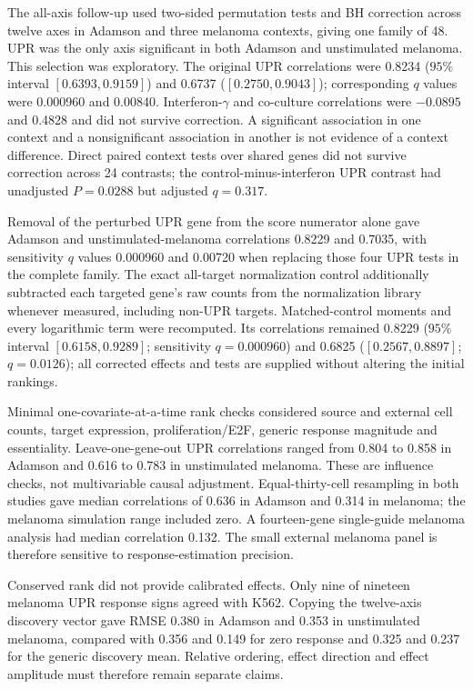 \documentclass[a4paper,fleqn]{cas-sc}
\makeatletter
\DeclareRobustCommand{\rev}[1]{{\color{red}\def\@citecolor{black}\def\@linkcolor{red}\def\@urlcolor{red}#1}}
\makeatother
\begin{document}
\rev{The all-axis follow-up used two-sided permutation tests and BH correction across twelve axes in Adamson and three melanoma contexts, giving one family of 48.} \rev{UPR was the only axis significant in both Adamson and unstimulated melanoma.} \rev{This selection was exploratory.} \rev{The original UPR correlations were 0.8234 ($95\%$ interval $[0.6393,0.9159]$) and 0.6737 ($[0.2750,0.9043]$); corresponding $q$ values were 0.000960 and 0.00840.} \rev{Interferon-$\gamma$ and co-culture correlations were $-0.0895$ and 0.4828 and did not survive correction.} \rev{A significant association in one context and a nonsignificant association in another is not evidence of a context difference.} \rev{Direct paired context tests over shared genes did not survive correction across 24 contrasts; the control-minus-interferon UPR contrast had unadjusted $P=0.0288$ but adjusted $q=0.317$.}

\rev{Removal of the perturbed UPR gene from the score numerator alone gave Adamson and unstimulated-melanoma correlations 0.8229 and 0.7035, with sensitivity $q$ values 0.000960 and 0.00720 when replacing those four UPR tests in the complete family.} \rev{The exact all-target normalization control additionally subtracted each targeted gene's raw counts from the normalization library whenever measured, including non-UPR targets.} \rev{Matched-control moments and every logarithmic term were recomputed.} \rev{Its correlations remained 0.8229 ($95\%$ interval $[0.6158,0.9289]$; sensitivity $q=0.000960$) and 0.6825 ($[0.2567,0.8897]$; $q=0.0126$); all corrected effects and tests are supplied without altering the initial rankings.}

\rev{Minimal one-covariate-at-a-time rank checks considered source and external cell counts, target expression, proliferation/E2F, generic response magnitude and essentiality.} \rev{Leave-one-gene-out UPR correlations ranged from 0.804 to 0.858 in Adamson and 0.616 to 0.783 in unstimulated melanoma.} \rev{These are influence checks, not multivariable causal adjustment.} \rev{Equal-thirty-cell resampling in both studies gave median correlations of 0.636 in Adamson and 0.314 in melanoma; the melanoma simulation range included zero.} \rev{A fourteen-gene single-guide melanoma analysis had median correlation 0.132.} \rev{The small external melanoma panel is therefore sensitive to response-estimation precision.}

\rev{Conserved rank did not provide calibrated effects.} \rev{Only nine of nineteen melanoma UPR response signs agreed with K562.} \rev{Copying the twelve-axis discovery vector gave RMSE 0.380 in Adamson and 0.353 in unstimulated melanoma, compared with 0.356 and 0.149 for zero response and 0.325 and 0.237 for the generic discovery mean.} \rev{Relative ordering, effect direction and effect amplitude must therefore remain separate claims.}
\end{document}
